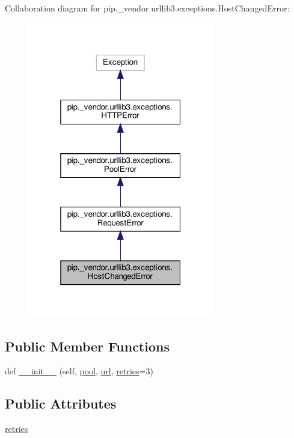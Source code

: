 Collaboration diagram for pip.\+\_\+vendor.\+urllib3.\+exceptions.\+Host\+Changed\+Error\+:
\nopagebreak
\begin{figure}[H]
\begin{center}
\leavevmode
\includegraphics[width=229pt]{classpip_1_1__vendor_1_1urllib3_1_1exceptions_1_1HostChangedError__coll__graph}
\end{center}
\end{figure}
\subsection*{Public Member Functions}
\begin{DoxyCompactItemize}
\item 
def \hyperlink{classpip_1_1__vendor_1_1urllib3_1_1exceptions_1_1HostChangedError_a711f426f4457b9f00e379b64b8d90d13}{\+\_\+\+\_\+init\+\_\+\+\_\+} (self, \hyperlink{classpip_1_1__vendor_1_1urllib3_1_1exceptions_1_1PoolError_a2953f9b92fd5cbcd2155a2aac9ef57c9}{pool}, \hyperlink{classpip_1_1__vendor_1_1urllib3_1_1exceptions_1_1RequestError_af4b69f97562d9547e8ee7af0d5485e1d}{url}, \hyperlink{classpip_1_1__vendor_1_1urllib3_1_1exceptions_1_1HostChangedError_a321c0732e59b41d83a3f0405b08af79e}{retries}=3)
\end{DoxyCompactItemize}
\subsection*{Public Attributes}
\begin{DoxyCompactItemize}
\item 
\hyperlink{classpip_1_1__vendor_1_1urllib3_1_1exceptions_1_1HostChangedError_a321c0732e59b41d83a3f0405b08af79e}{retries}
\end{DoxyCompactItemize}


